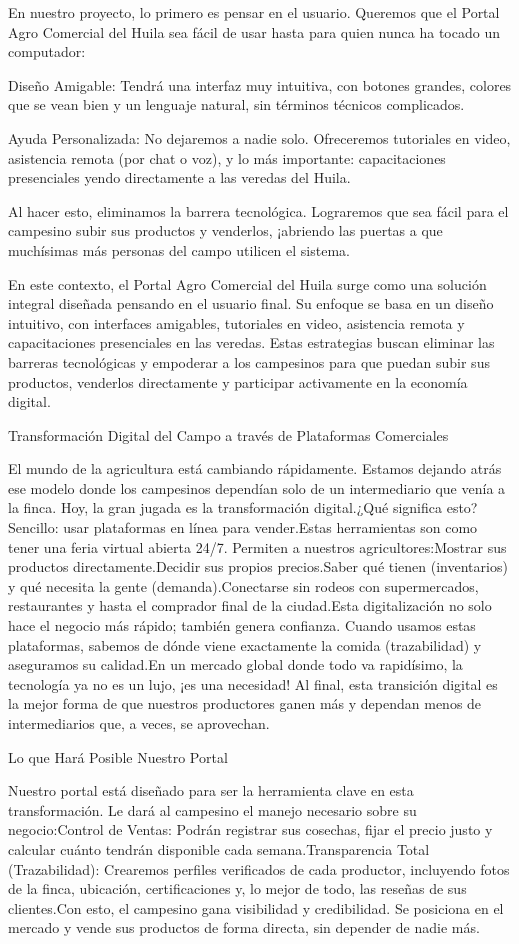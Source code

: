 En nuestro proyecto, lo primero es pensar en el usuario. Queremos que el Portal Agro Comercial del Huila sea fácil de usar hasta para quien nunca ha tocado un computador:

Diseño Amigable: Tendrá una interfaz muy intuitiva, con botones grandes, colores que se vean bien y un lenguaje natural, sin términos técnicos complicados.

Ayuda Personalizada: No dejaremos a nadie solo. Ofreceremos tutoriales en video, asistencia remota (por chat o voz), y lo más importante: capacitaciones presenciales yendo directamente a las veredas del Huila.

Al hacer esto, eliminamos la barrera tecnológica. Lograremos que sea fácil para el campesino subir sus productos y venderlos, ¡abriendo las puertas a que muchísimas más personas del campo utilicen el sistema.

En este contexto, el Portal Agro Comercial del Huila surge como una solución integral diseñada pensando en el usuario final. Su enfoque se basa en un diseño intuitivo, con interfaces amigables, tutoriales en video, asistencia remota y capacitaciones presenciales en las veredas. Estas estrategias buscan eliminar las barreras tecnológicas y empoderar a los campesinos para que puedan subir sus productos, venderlos directamente y participar activamente en la economía digital.

Transformación Digital del Campo a través de Plataformas Comerciales

El mundo de la agricultura está cambiando rápidamente. Estamos dejando atrás ese modelo donde los campesinos dependían solo de un intermediario que venía a la finca. Hoy, la gran jugada es la transformación digital.¿Qué significa esto? Sencillo: usar plataformas en línea para vender.Estas herramientas son como tener una feria virtual abierta 24/7. Permiten a nuestros agricultores:Mostrar sus productos directamente.Decidir sus propios precios.Saber qué tienen (inventarios) y qué necesita la gente (demanda).Conectarse sin rodeos con supermercados, restaurantes y hasta el comprador final de la ciudad.Esta digitalización no solo hace el negocio más rápido; también genera confianza. Cuando usamos estas plataformas, sabemos de dónde viene exactamente la comida (trazabilidad) y aseguramos su calidad.En un mercado global donde todo va rapidísimo, la tecnología ya no es un lujo, ¡es una necesidad! Al final, esta transición digital es la mejor forma de que nuestros productores ganen más y dependan menos de intermediarios que, a veces, se aprovechan.

Lo que Hará Posible Nuestro Portal

Nuestro portal está diseñado para ser la herramienta clave en esta transformación. Le dará al campesino el manejo necesario sobre su negocio:Control de Ventas: Podrán registrar sus cosechas, fijar el precio justo y calcular cuánto tendrán disponible cada semana.Transparencia Total (Trazabilidad): Crearemos perfiles verificados de cada productor, incluyendo fotos de la finca, ubicación, certificaciones y, lo mejor de todo, las reseñas de sus clientes.Con esto, el campesino gana visibilidad y credibilidad. Se posiciona en el mercado y vende sus productos de forma directa, sin depender de nadie más.